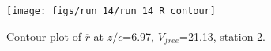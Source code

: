 \begin{figure}[H]
\centering
\texttt{[image: figs/run\_14/run\_14\_R\_contour]}
\caption{Contour plot of $\overline{r}$ at $z/c$=6.97, $V_{free}$=21.13, station 2.}
\label{fig:run_14_R_contour}
\end{figure}


